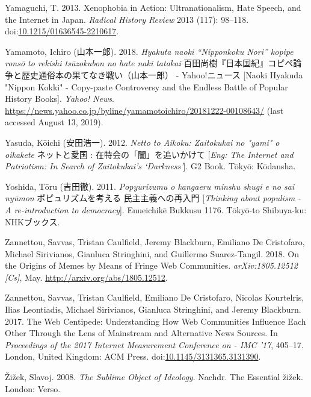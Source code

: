 \documentclass[10pt,british,A4paper,oneside]{memoir}
\begin{document}
\hypertarget{ref-yamaguchi_xenophobia_2013}{}
Yamaguchi, T. 2013. Xenophobia in Action: Ultranationalism, Hate Speech,
and the Internet in Japan. \emph{Radical History Review} 2013 (117):
98--118.
doi:\href{https://doi.org/10.1215/01636545-2210617}{10.1215/01636545-2210617}.

\hypertarget{ref-yamamoto__2018}{}
Yamamoto, Ichiro (山本一郎). 2018.
\emph{Hyakuta naoki “Nipponkoku Nori” kopipe ronsō to rekishi tsūzokubon no hate naki tatakai} 百田尚樹『日本国紀』コピペ論争と歴史通俗本の果てなき戦い（山本一郎） - Yahoo!ニュース [Naoki Hyakuda "Nippon Kokki" - Copy-paste Controversy and the Endless Battle of Popular History Books]. \emph{Yahoo! News}.
\url{https://news.yahoo.co.jp/byline/yamamotoichiro/20181222-00108643/} (last accessed August 13, 2019).

\hypertarget{ref-yasuda_eng:_2012}{}
Yasuda, Kōichi (安田浩一). 2012. \emph{Netto to Aikoku: Zaitokukai no "yami" o oikakete} ネットと愛国 : 在特会の「闇」を追いかけて [\emph{Eng: The Internet and Patriotism: In Search of Zaitokukai's `Darkness'}]. G2 Book. Tōkyō: Kōdansha.

\hypertarget{ref-yoshida__2011}{}
Yoshida, Tōru (吉田徹). 2011. \emph{Popyurizumu o kangaeru minshu shugi e no sai nyūmon} ポピュリズムを考える 民主主義への再入門 [\emph{Thinking about populism - A re-introduction to democracy}].
Enueichikē Bukkusu 1176. Tōkyō-to Shibuya-ku: NHKブックス.

\hypertarget{ref-zannettou_origins_2018}{}
Zannettou, Savvas, Tristan Caulfield, Jeremy Blackburn, Emiliano De
Cristofaro, Michael Sirivianos, Gianluca Stringhini, and Guillermo
Suarez-Tangil. 2018. On the Origins of Memes by Means of Fringe Web
Communities. \emph{arXiv:1805.12512 {[}Cs{]}}, May.
\url{http://arxiv.org/abs/1805.12512}.

\hypertarget{ref-zannettou_web_2017}{}
Zannettou, Savvas, Tristan Caulfield, Emiliano De Cristofaro, Nicolas
Kourtelris, Ilias Leontiadis, Michael Sirivianos, Gianluca Stringhini,
and Jeremy Blackburn. 2017. The Web Centipede: Understanding How Web
Communities Influence Each Other Through the Lens of Mainstream and
Alternative News Sources. In \emph{Proceedings of the 2017 Internet
Measurement Conference on - IMC '17}, 405--17. London, United Kingdom:
ACM Press.
doi:\href{https://doi.org/10.1145/3131365.3131390}{10.1145/3131365.3131390}.

\hypertarget{ref-zizek_sublime_2008}{}
Žižek, Slavoj. 2008. \emph{The Sublime Object of Ideology}. Nachdr. The
Essential žižek. London: Verso.
\end{document}
